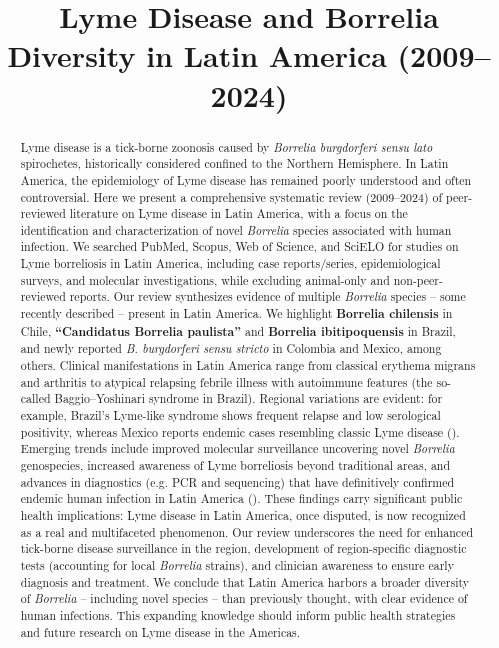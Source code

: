 \documentclass[11pt,letterpaper]{article}
\title{\setstretch{1.2}Lyme Disease and Borrelia Diversity in Latin America (2009–2024)}
\author{}
\date{}
\begin{document}
\maketitle

\begin{abstract}
Lyme disease is a tick-borne zoonosis caused by \textit{Borrelia burgdorferi sensu lato} spirochetes, historically considered confined to the Northern Hemisphere. In Latin America, the epidemiology of Lyme disease has remained poorly understood and often controversial. Here we present a comprehensive systematic review (2009–2024) of peer-reviewed literature on Lyme disease in Latin America, with a focus on the identification and characterization of novel \textit{Borrelia} species associated with human infection. We searched PubMed, Scopus, Web of Science, and SciELO for studies on Lyme borreliosis in Latin America, including case reports/series, epidemiological surveys, and molecular investigations, while excluding animal-only and non-peer-reviewed reports. Our review synthesizes evidence of multiple \textit{Borrelia} species – some recently described – present in Latin America. We highlight \textbf{Borrelia chilensis} in Chile, \textbf{“Candidatus Borrelia paulista”} and \textbf{Borrelia ibitipoquensis} in Brazil, and newly reported \textit{B. burgdorferi sensu stricto} in Colombia and Mexico, among others. Clinical manifestations in Latin America range from classical erythema migrans and arthritis to atypical relapsing febrile illness with autoimmune features (the so-called Baggio–Yoshinari syndrome in Brazil). Regional variations are evident: for example, Brazil’s Lyme-like syndrome shows frequent relapse and low serological positivity, whereas Mexico reports endemic cases resembling classic Lyme disease (\citealt{Colunga-Salas2020}). Emerging trends include improved molecular surveillance uncovering novel \textit{Borrelia} genospecies, increased awareness of Lyme borreliosis beyond traditional areas, and advances in diagnostics (e.g. PCR and sequencing) that have definitively confirmed endemic human infection in Latin America (\citealt{Colunga-Salas2020}). These findings carry significant public health implications: Lyme disease in Latin America, once disputed, is now recognized as a real and multifaceted phenomenon. Our review underscores the need for enhanced tick-borne disease surveillance in the region, development of region-specific diagnostic tests (accounting for local \textit{Borrelia} strains), and clinician awareness to ensure early diagnosis and treatment. We conclude that Latin America harbors a broader diversity of \textit{Borrelia} – including novel species – than previously thought, with clear evidence of human infections. This expanding knowledge should inform public health strategies and future research on Lyme disease in the Americas.
\end{abstract}
\end{document}
